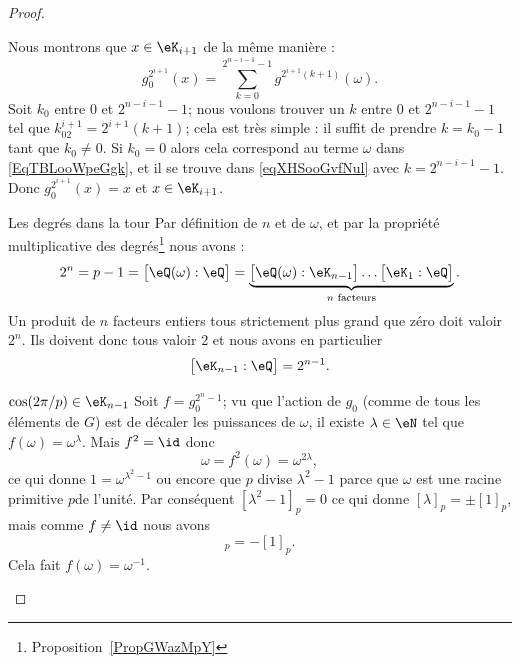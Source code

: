 \begin{proof}
\begin{subproof}
\begin{subproof}
                        Nous montrons que \( x\in \eK_{i+1}\) de la même manière :
                        \begin{equation}    \label{eqXHSooGvfNul}
                            g_0^{2^{i+1}}(x)=\sum_{k=0}^{2^{n-i-1}-1}g^{2^{i+1}(k+1)}(\omega).
                        \end{equation}
                        Soit \( k_0\) entre \( 0\) et \( 2^{n-i-1}-1\); nous voulons trouver un \( k\) entre \( 0\) et \( 2^{n-i-1}-1\) tel que \( k_02^{i+1}=2^{i+1}(k+1)\); cela est très simple : il suffit de prendre \( k=k_0-1\) tant que \( k_0\neq 0\). Si \( k_0=0\) alors cela correspond au terme \( \omega\) dans \eqref{EqTBLooWpeGgk}, et il se trouve dans \eqref{eqXHSooGvfNul} avec \( k=2^{n-i-1}-1\). Donc \( g_0^{2^{i+1}}(x)=x\) et \( x\in \eK_{i+1}\).
                    \item[Les degrés dans la tour]
                        Par définition de \( n\) et de \( \omega\), et par la propriété multiplicative des degrés\footnote{Proposition~\ref{PropGWazMpY}} nous avons :
                        \begin{equation}
                            2^n=p-1=\big[ \eQ(\omega):\eQ \big]=\underbrace{\big[ \eQ(\omega):\eK_{n-1} \big]\ldots\big[ \eK_1:\eQ \big]}_{ n\text{ facteurs}}.
                        \end{equation}
                        Un produit de \( n\) facteurs entiers tous strictement plus grand que zéro doit valoir \( 2^n\). Ils doivent donc tous valoir \( 2\) et nous avons en particulier
                        \begin{equation}
                            \big[ \eK_{n-1}:\eQ \big]=2^{n-1}.
                        \end{equation}
                    \item[\( \cos(2\pi/p)\in \eK_{n-1}\)]
                        Soit \( f=g_0^{2^n-1}\); vu que l'action de \( g_0\) (comme de tous les éléments de \( G\)) est de décaler les puissances de \( \omega\), il existe \( \lambda\in \eN\) tel que \( f(\omega)=\omega^{\lambda}\). Mais \( f^2=\id\) donc
                        \begin{equation}
                            \omega=f^2(\omega)=\omega^{2\lambda},
                        \end{equation}
                        ce qui donne \( 1=\omega^{\lambda^2-1}\) ou encore que \( p\) divise \( \lambda^2-1\) parce que \( \omega\) est une racine primitive \( p\)\ieme de l'unité. Par conséquent \( [\lambda^2-1]_p=0\) ce qui donne \( [\lambda]_p=\pm[1]_p\), mais comme \( f\neq \id\) nous avons
                        \begin{equation}
                            [\lambda]_p=-[1]_p.
                        \end{equation}
                        Cela fait \( f(\omega)=\omega^{-1}\).


\end{subproof}
\end{subproof}
\end{proof}
